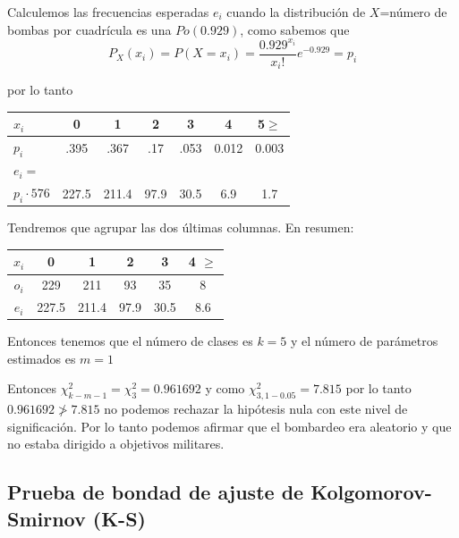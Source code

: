 \documentclass[12pt]{report}
\begin{document}
           Calculemos las frecuencias esperadas $e_{i}$ cuando la
           distribución de $X$=número de bombas por cuadrícula es una
           $Po(0.929)$, como sabemos que
           $$P_{X}(x_{i})=P(X=x_{i})=
           \frac{{0.929}^{x_{i}}}{x_{i}!} e^{-0.929}=p_{i}$$

           por lo tanto
           
\begin{center}
 \begin{tabular}{|l|cccccc|}
           \hline
           $x_{i}$ & 0 & 1 & 2 & 3 & 4 & 5$\geq$  \\
           \hline
           $p_{i}$&  .395  & .367  & .17 & .053  & 0.012  &
           0.003 \\
           \hline
           $e_{i}=$ & & & & & &  \\
            $p_{i}\cdot 576$ & 227.5 &  211.4   &  97.9   & 30.5  & 6.9& 1.7\\
           \hline
    \end{tabular}
\end{center}

           Tendremos que agrupar
           las dos últimas columnas. En resumen:

\begin{center}
           \begin{tabular}{|c|ccccc|}
               \hline
               $x_{i}$ & 0 & 1 & 2 & 3 & 4 $\geq$ \\
               \hline
               $o_{i}$ & 229 & 211 & 93 &35 & 8\\
               \hline
               $e_{i}$ & 227.5 &  211.4   &  97.9 & 30.5 & 8.6\\ \hline
               \end{tabular}
\end{center}

           Entonces tenemos que el número de clases es $k=5$ y  el número
           de parámetros estimados es $m=1$

           Entonces $\chi^2_{k-m-1}=\chi^2_{3}=  0.961692$ y como
           $\chi^2_{3,1-0.05}=7.815$ por lo tanto  $0.961692\not>7.815$ no podemos rechazar
           la hipótesis nula con este nivel de significación. Por lo
           tanto podemos afirmar que el bombardeo era aleatorio y que no
           estaba dirigido a objetivos militares.
           
           
           
           \subsection{Prueba de bondad de ajuste de Kolgomorov-Smirnov (K-S)}
           
\end{document}
